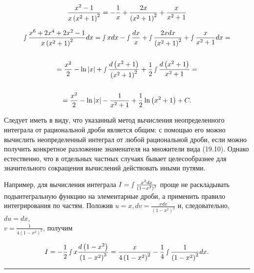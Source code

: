 \documentclass[12pt]{extbook}
\begin{document}
{}


\begin{equation}
    \frac{x^{2}-1}{x\left(x^{2}+1\right)^{2}}=-\frac{1}{x}+\frac{2 x}{\left(x^{2}+1\right)^{2}}+\frac{x}{x^{2}+1} \notag
\end{equation}


\fontsize{10pt}{14pt}\selectfont
\begin{gather}
    \smallint \frac{x^{6}+2 x^{4}+2 x^{2}-1}{x\left(x^{2}+1\right)^{2}} d x=\smallint x d x-\smallint \frac{d x}{x}+\smallint \frac{2 x d x}{\left(x^{2}+1\right)^{2}}+\smallint \frac{x}{x^{2}+1} d x= \notag \\ \notag \\
    =\frac{x^{2}}{2}-\ln |x|+\smallint \frac{d\left(x^{2}+1\right)}{\left(x^{2}+1\right)^{2}}+\frac{1}{2} \smallint \frac{d\left(x^{2}+1\right)}{x^{2}+1}= \notag \\ \notag \\
    =\frac{x^{2}}{2}-\ln |x|-\frac{1}{x^{2}+1}+\frac{1}{2} \ln \left(x^{2}+1\right)+C . \notag
\end{gather}
\normalsize

\setlength{\spaceskip}{12pt}

Следует иметь в виду, что указанный метод вычисления неопределенного интеграла от рациональной дроби является общим: с помощью его можно вычислить неопределенный интеграл от любой рациональной дроби, если можно получить конкретное разложение знаменателя на множители вида (19.10). Однако естественно, что в отдельных частных случаях бывает целесообразнее для значительного сокращения вычислений действовать иными путями.

Например, для вычисления интеграла $I=\smallint \frac{x^{2} d x}{\left(1-x^{2}\right)^{3}}$ проще не раскладывать подынтегральную функцию на элементарные дроби, а применить правило интегрирования по частям. Положив $u=x, d v=\frac{x d x}{\left(1-x^{2}\right)^{3}}$ и, следовательно, $d u=d x$, \\$ v=\frac{1}{4\left(1-x^{2}\right)^{2}} $, получим

\begin{align}
    & \quad I=-\frac{1}{2} \smallint x \frac{d\left(1-x^{2}\right)}{\left(1-x^{2}\right)^{3}}=\frac{x}{4\left(1-x^{2}\right)^{2}}-\frac{1}{4} \smallint \frac{1}{\left(1-x^{2}\right)^{2}} d x . \notag
\end{align}

\begin{center}
\rule{1in}{0.4pt} \\ \textit{\thepage}
\end{center}
\end{document}
